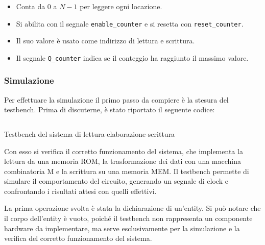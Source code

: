 \begin{itemize}
    \begin{itemize}
        \item Conta da $0$ a $N-1$ per leggere ogni locazione.
        \item Si abilita con il segnale \texttt{enable\_counter} e si resetta con \texttt{reset\_counter}.
        \item Il suo valore è usato come indirizzo di lettura e scrittura.
        \item Il segnale \texttt{Q\_counter} indica se il conteggio ha raggiunto il massimo valore.
    \end{itemize}
\end{itemize}

\subsubsection{Simulazione}
Per effettuare la simulazione il primo passo da compiere è la stesura del testbench. Prima di discuterne, è stato riportato il seguente codice:

\begin{code}
    \inputminted{vhdl}{vhdl/rom_m_mem_tb.vhd}
    \caption{Testbench del sistema di lettura-elaborazione-scrittura}
    \label{cod:rom_m_mem_tb}
\end{code}

Con esso si verifica il corretto funzionamento del sistema, che implementa la lettura da una memoria ROM, la trasformazione dei dati con una macchina combinatoria M e la scrittura su una memoria MEM. Il testbench permette di simulare il comportamento del circuito, generando un segnale di clock e confrontando i risultati attesi con quelli effettivi.

La prima operazione svolta è stata la dichiarazione di un’entity. Si può notare che il corpo dell’entity è vuoto, poiché il testbench non rappresenta un componente hardware da implementare, ma serve esclusivamente per la simulazione e la verifica del corretto funzionamento del sistema.

